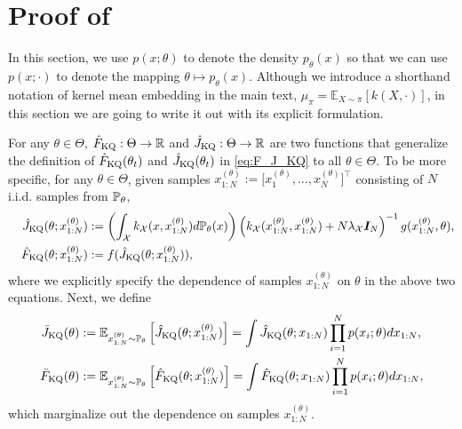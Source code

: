 \section{Proof of }\label{sec:proof}
\begin{rem}
    In this section, we use $p(x; \theta)$ to denote the density $p_\theta(x)$ so that we can use $p(x; \cdot)$ to denote the mapping $\theta \mapsto p_\theta(x)$. Although we introduce a shorthand notation of kernel mean embedding in the main text, $\mu_\pi = \mathbb{E}_{X \sim \pi}[k(X,\cdot)]$, in this section we are going to write it out with its explicit formulation.
\end{rem}

For any $\theta \in \Theta$, $\hat{F}_{\text{KQ}}: \Theta \to \mathbb{R}$  and $\hat{J}_{\text{KQ}}: \Theta \to \mathbb{R}$ are two functions that generalize the definition of $\hat{F}_{\text{KQ}}(\theta_t)$ and $\hat{J}_{\text{KQ}}(\theta_t)$ in \eqref{eq:F_J_KQ} to all $\theta \in \Theta$. 
To be more specific, for any $\theta \in \Theta$, given samples $x_{1:N}^{(\theta)} := \big[ x_1^{(\theta)}, \ldots, x_N^{(\theta)} \big]^\top$ consisting of $N$ i.i.d. samples from $\mathbb{P}_\theta$,
\begin{align}\label{eq:hat_F_KQ_all_theta}
    \hat{J}_{\text{KQ}} (\theta; x_{1:N}^{(\theta)}) &:= \left( \int_{\mathcal{X}} k_{\mathcal{X}} (x, x_{1:N}^{(\theta)}) d \mathbb{P}_{\theta}(x) \right) \left( k_{\mathcal{X}} (x_{1:N}^{(\theta)}, x_{1:N}^{(\theta)}) + N \lambda_{\mathcal{X}} \boldsymbol{I}_N \right)^{-1} g(x_{1:N}^{(\theta)}, \theta), \\
    \quad \hat{F}_{\text{KQ}}(\theta; x_{1:N}^{(\theta)}) &:= f(\hat{J}_{\text{KQ}} (\theta; x_{1:N}^{(\theta)})),
\end{align}
where we explicitly specify the dependence of samples $x_{1:N}^{(\theta)}$ on $\theta$ in the above two equations. 
Next, we define 
\begin{align}\label{eq:bar_F_KQ_all_theta}
\begin{aligned}
    \bar{J}_{\text{KQ}} (\theta) &:= \operatorname{\mathbb{E}}_{x_{1:N}^{(\theta)} \sim \mathbb{P}_\theta} \left[\hat{J}_{\text{KQ}} (\theta; x_{1:N}^{(\theta)})\right] = \int \hat{J}_{\text{KQ}} (\theta; x_{1:N}) \prod_{i=1}^N p(x_i; \theta) dx_{1:N}, \\ 
    \bar{F}_{\text{KQ}} (\theta) &:= \operatorname{\mathbb{E}}_{x_{1:N}^{(\theta)} \sim \mathbb{P}_\theta} \left[\hat{F}_{\text{KQ}} (\theta; x_{1:N}^{(\theta)})\right] = \int \hat{F}_{\text{KQ}} (\theta; x_{1:N}) \prod_{i=1}^N p(x_i; \theta) dx_{1:N},
\end{aligned}
\end{align}
which marginalize out the dependence on samples $x_{1:N}^{(\theta)}$. 
